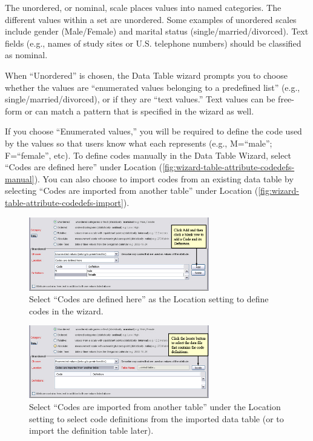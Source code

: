 The unordered, or nominal, scale places values into named categories.
The different values within a set are unordered. Some examples of
unordered scales include gender (Male/Female) and marital status
(single/married/divorced). Text fields (e.g., names of study sites or
U.S. telephone numbers) should be classified as nominal.

When ``Unordered'' is chosen, the Data Table wizard prompts you to
choose whether the values are ``enumerated values belonging to a
predefined list'' (e.g., single/married/divorced), or if they are ``text
values.'' Text values can be free-form or can match a pattern that is
specified in the wizard as well. 

If you choose ``Enumerated values,'' you will be required to define the
code used by the values so that users know what each represents (e.g.,
M=``male''; F=``female'', etc). To define codes manually in the Data
Table Wizard, select ``Codes are defined here'' under Location
(\autoref{fig:wizard-table-attribute-codedefs-manual}). You can also
choose to import codes from an existing data table by selecting ``Codes
are imported from another table'' under Location
(\autoref{fig:wizard-table-attribute-codedefs-import}).

\begin{figure}
  \centering
    \includegraphics[width=0.7\textwidth]{images/wizard-table-attribute-codedefs-manual.jpg}
  \caption{Select ``Codes are defined here'' as the Location setting to
    define codes in the wizard.}
  \label{fig:wizard-table-attribute-codedefs-manual}
\end{figure}

\begin{figure}
  \centering
    \includegraphics[width=0.7\textwidth]{images/wizard-table-attribute-codedefs-import.jpg}
  \caption{Select ``Codes are imported from another table'' under the
    Location setting to select code definitions from the imported data
    table (or to import the definition table later).}
  \label{fig:wizard-table-attribute-codedefs-import}
\end{figure}


